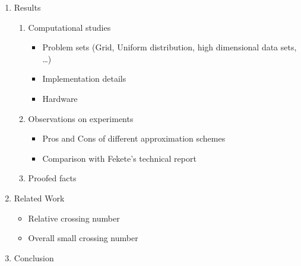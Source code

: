 \documentclass[a4paper,pagesize]{scrartcl}
\begin{document}
\begin{enumerate}
        \item Results
            \begin{enumerate}
                \item Computational studies
                    \begin{itemize}
                        \item Problem sets (Grid, Uniform distribution, high
                            dimensional data sets, \dots)
                        \item Implementation details
                        \item Hardware
                    \end{itemize}
                \item Observations on experiments
                    \begin{itemize}
                        \item Pros and Cons of different approximation schemes
                        \item Comparison with Fekete's technical report
                    \end{itemize}
                \item Proofed facts
            \end{enumerate}

        \item Related Work
            \begin{itemize}
                \item Relative crossing number
                \item Overall small crossing number
            \end{itemize}
        \item Conclusion
    \end{enumerate}
\end{document}

